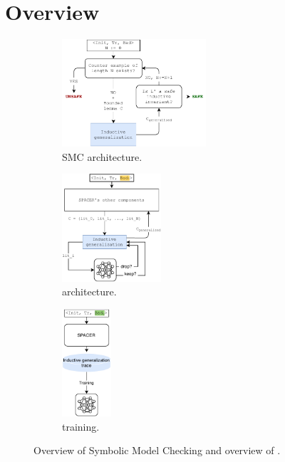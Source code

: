 \section{Overview}
\label{sec:overview}
\begin{figure}[t]
  \centering
  \begin{subfigure}[b]{0.4\textwidth}
  \centering
    \includegraphics[height=4cm]{figures/doping-spacer}
    \caption{SMC architecture.}
    \label{fig:smc}
  \end{subfigure}
  \begin{subfigure}[b]{0.31\textwidth}
    \centering
    \includegraphics[height=4cm]{figures/doping-Page-general_architecture.pdf}
    \caption{\dpy architecture.}
    \label{fig:dopey}
	\end{subfigure}
  \begin{subfigure}[b]{0.15\textwidth}
  \centering
    \includegraphics[height=4cm]{figures/doping-training.pdf}
    \caption{\dpy training.}
    \label{fig:spc_train}
	\end{subfigure}
	\caption{Overview of Symbolic Model Checking and overview of \dpy.}
	\vspace{-0.2in}
  \label{fig:overview}
\end{figure}


